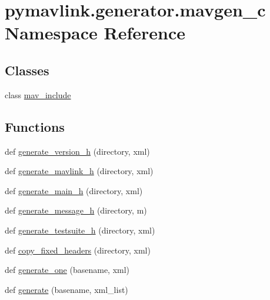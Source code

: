 \hypertarget{namespacepymavlink_1_1generator_1_1mavgen__c}{}\section{pymavlink.\+generator.\+mavgen\+\_\+c Namespace Reference}
\label{namespacepymavlink_1_1generator_1_1mavgen__c}
\subsection*{Classes}
\begin{DoxyCompactItemize}
\item 
class \hyperlink{classpymavlink_1_1generator_1_1mavgen__c_1_1mav__include}{mav\+\_\+include}
\end{DoxyCompactItemize}
\subsection*{Functions}
\begin{DoxyCompactItemize}
\item 
def \hyperlink{namespacepymavlink_1_1generator_1_1mavgen__c_a205f217ad0dbb66616d4b22cd91e6d5e}{generate\+\_\+version\+\_\+h} (directory, xml)
\item 
def \hyperlink{namespacepymavlink_1_1generator_1_1mavgen__c_a6386de4b9abb860e912889c7ee80c29d}{generate\+\_\+mavlink\+\_\+h} (directory, xml)
\item 
def \hyperlink{namespacepymavlink_1_1generator_1_1mavgen__c_a09e8fc15eab60988aced8eb66f6f011f}{generate\+\_\+main\+\_\+h} (directory, xml)
\item 
def \hyperlink{namespacepymavlink_1_1generator_1_1mavgen__c_a123dcae06322bbc40fe755d31c7064ad}{generate\+\_\+message\+\_\+h} (directory, m)
\item 
def \hyperlink{namespacepymavlink_1_1generator_1_1mavgen__c_a0e011b90c365fd8dcb174271880c26e0}{generate\+\_\+testsuite\+\_\+h} (directory, xml)
\item 
def \hyperlink{namespacepymavlink_1_1generator_1_1mavgen__c_a3a09ff51409f0e3465b69f6760f622fb}{copy\+\_\+fixed\+\_\+headers} (directory, xml)
\item 
def \hyperlink{namespacepymavlink_1_1generator_1_1mavgen__c_aab7c75fa969b1d44059ca021ff91c91f}{generate\+\_\+one} (basename, xml)
\item 
def \hyperlink{namespacepymavlink_1_1generator_1_1mavgen__c_a40a6fdda7e5220bab2069a50a82afe48}{generate} (basename, xml\+\_\+list)
\end{DoxyCompactItemize}
